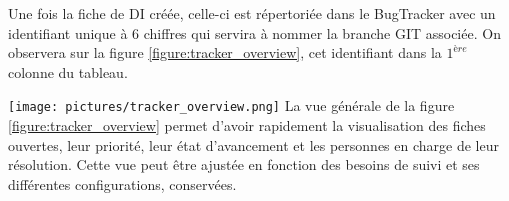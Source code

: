 Une fois la fiche de DI créée, celle-ci est répertoriée dans le BugTracker avec un identifiant unique à 6 chiffres qui servira à nommer la branche GIT associée. On observera sur la figure \ref{figure:tracker_overview}, cet identifiant dans la $1^{ère}$ colonne du tableau.\\ \vspace*{0.3cm}

\texttt{[image: pictures/tracker\_overview.png]}\vspace*{0.1cm}
\vspace*{0.3cm}
La vue générale de la figure \ref{figure:tracker_overview} permet d'avoir rapidement la visualisation des fiches ouvertes, leur priorité, leur état d'avancement et les personnes en charge de leur résolution. Cette vue peut être ajustée en fonction des besoins de suivi et ses différentes configurations, conservées.

